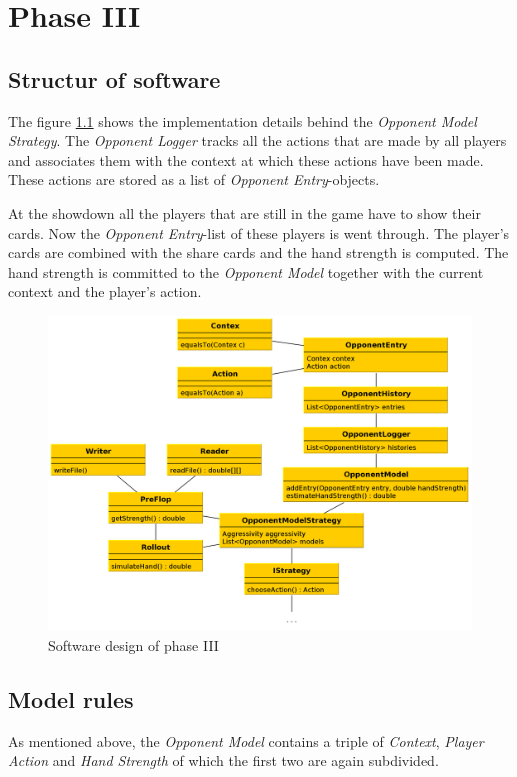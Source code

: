 \chapter{Phase III}

\section{Structur of software}
The figure \ref{fig:phase3} shows the implementation details behind the \emph{Opponent Model Strategy}. The \emph{Opponent Logger} tracks all the actions that are made by all players and associates them with the context at which these actions have been made. These actions are stored as a list of \emph{Opponent Entry}-objects. 

At the showdown all the players that are still in the game have to show their cards. Now the \emph{Opponent Entry}-list of these players is went through. The player's cards are combined with the share cards and the hand strength is computed. The hand strength is committed to the \emph{Opponent Model} together with the current context and the player's action.

\begin{figure}[h]
  \centering
  \includegraphics[width=1.0\textwidth]{images/phase3}
  \caption{Software design of phase III}
  \label{fig:phase3}
\end{figure}

\section{Model rules}
As mentioned above, the \emph{Opponent Model} contains  a triple of \emph{Context}, \emph{Player Action} and \emph{Hand Strength} of which the first two are again subdivided.

